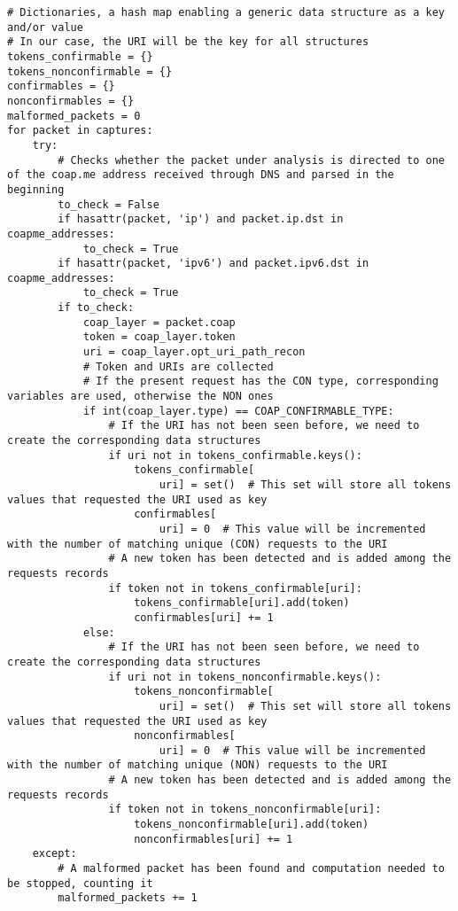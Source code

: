 \documentclass[a4paper,11pt]{article} %
\begin{document}
\begin{verbatim}
# Dictionaries, a hash map enabling a generic data structure as a key and/or value
# In our case, the URI will be the key for all structures
tokens_confirmable = {}
tokens_nonconfirmable = {}
confirmables = {}
nonconfirmables = {}
malformed_packets = 0
for packet in captures:
    try:
        # Checks whether the packet under analysis is directed to one of the coap.me address received through DNS and parsed in the beginning
        to_check = False
        if hasattr(packet, 'ip') and packet.ip.dst in coapme_addresses:
            to_check = True
        if hasattr(packet, 'ipv6') and packet.ipv6.dst in coapme_addresses:
            to_check = True
        if to_check:
            coap_layer = packet.coap
            token = coap_layer.token
            uri = coap_layer.opt_uri_path_recon
            # Token and URIs are collected
            # If the present request has the CON type, corresponding variables are used, otherwise the NON ones
            if int(coap_layer.type) == COAP_CONFIRMABLE_TYPE:
                # If the URI has not been seen before, we need to create the corresponding data structures
                if uri not in tokens_confirmable.keys():
                    tokens_confirmable[
                        uri] = set()  # This set will store all tokens values that requested the URI used as key
                    confirmables[
                        uri] = 0  # This value will be incremented with the number of matching unique (CON) requests to the URI
                # A new token has been detected and is added among the requests records
                if token not in tokens_confirmable[uri]:
                    tokens_confirmable[uri].add(token)
                    confirmables[uri] += 1
            else:
                # If the URI has not been seen before, we need to create the corresponding data structures
                if uri not in tokens_nonconfirmable.keys():
                    tokens_nonconfirmable[
                        uri] = set()  # This set will store all tokens values that requested the URI used as key
                    nonconfirmables[
                        uri] = 0  # This value will be incremented with the number of matching unique (NON) requests to the URI
                # A new token has been detected and is added among the requests records
                if token not in tokens_nonconfirmable[uri]:
                    tokens_nonconfirmable[uri].add(token)
                    nonconfirmables[uri] += 1
    except:
        # A malformed packet has been found and computation needed to be stopped, counting it
        malformed_packets += 1


\end{verbatim}
\end{document}
